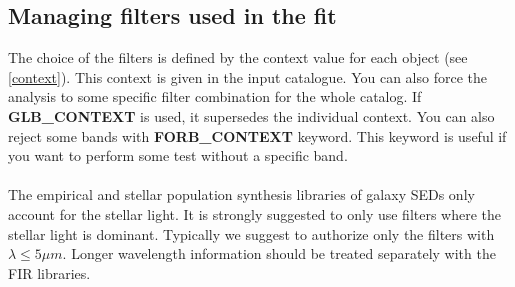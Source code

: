 \documentclass[12pt]{article}
\begin{document}
\subsection{Managing filters used in the fit}\label{fit} 

%
The choice of the filters is defined by the context value for each object (see \ref{context}). This context is given in the input catalogue. You can also force the analysis to some specific filter combination for the whole catalog. If {\bf GLB\_CONTEXT} is used, it supersedes the individual context. You can also reject some bands with {\bf FORB\_CONTEXT} keyword. This keyword is useful if you want to perform some test without a specific band.\\
\\
The empirical and stellar population synthesis libraries of galaxy SEDs only account for the stellar light. It is strongly suggested to only use filters where the stellar light is dominant. Typically we suggest to authorize only the filters with $\lambda\le 5\mu m$. Longer wavelength information should be treated separately with the FIR libraries. \\ 
 
\end{document}
